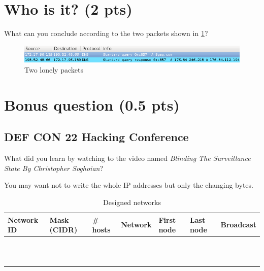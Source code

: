 \documentclass[11pt]{article}
\begin{document}
	\section{Who is it? (2 pts)}
		What can you conclude according to the two packets shown in \ref{fig:dns}? %
		\begin{figure}[h]
			\begin{center}
				\includegraphics[width=18cm]{dns.png}
				\caption{Two lonely packets}
				\label{fig:dns}
			\end{center}
		\end{figure}
		\vspace{1cm}

\section{Bonus question (0.5 pts)}
	\subsection{DEF CON 22 Hacking Conference}
		What did you learn by watching to the video named \emph{Blinding The Surveillance State By Christopher Soghoian}? %
\pagebreak

You may want not to write the whole IP addresses but only the changing bytes.
\renewcommand{\arraystretch}{1.5}
\setlength{\tabcolsep}{14pt}
	\begin{table}[h]
	  \centering
		  \begin{tabular}{|l|l|l|l|l|l|l|}
			  \hline
				Network ID	&	Mask (CIDR)	& \# hosts	& Network	&	First node	&	Last node	&	Broadcast	\\ \hline
				&&&&&&	\\ \hline
				&&&&&&	\\ \hline
				&&&&&&	\\ \hline
				&&&&&&	\\ \hline
				&&&&&&	\\ \hline
				&&&&&&	\\ \hline
				&&&&&&	\\ \hline
				&&&&&&	\\ \hline
				&&&&&&	\\ \hline
				&&&&&&	\\ \hline
				&&&&&&	\\ \hline
		  \end{tabular}
		  \caption{Designed networks}
	  \label{tab:design}
	\end{table}
\renewcommand{\arraystretch}{1.0}
\end{document}

